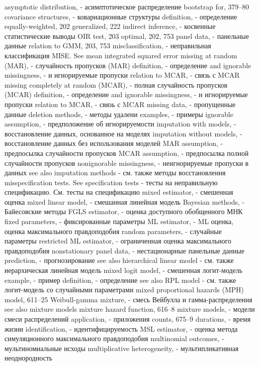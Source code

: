 asymptotic distribution, - асимптотическое распределение
bootstrap for, 379–80 
covariance structures, - ковариационные структуры
definition, - определение
equally-weighted, 202 generalized, 222
indirect inference, - косвенные статистические выводы 
OIR test, 203
optimal, 202, 753
panel data, - панельные данные 
relation to GMM, 203, 753
misclassification, - неправильная классификация
MISE. See mean integrated squared error 
missing at random (MAR), - случайность пропусков (MAR)
definition, - определение
and ignorable missingness, - и игнорируемые пропуски
relation to MCAR, - связь с MCAR
missing completely at random (MCAR), - полная случайность пропусков (MCAR)
definition, - определение
and ignorable missingness, - и игнорируемые пропуски
relation to MCAR, - связь с MCAR
missing data, - пропущенные данные
deletion methods, - методы удалени
examples, - примеры
ignorable assumption, - предположение об игнорируемости
imputation with models, - восстановление данных, основанное на моделях
imputation without models, - восстановление данных без использования моделей
MAR assumption, - предпосылка случайности пропусков
MCAR assumption, - предпосылка полной случайности пропусков
nonignorable missingness, - неигнорируемые пропуски в данных
see also imputation methods - см. также методы восстановления
misspecification tests. See specification tests - тесты на неправильную спецификацию. См. тесты на спецификацию
mixed estimator, - смешенная оценка
mixed linear model, - смешанная линейная модель 
Bayesian methods, - Байесовские методы
FGLS estimator, - оценка доступного обобщенного МНК
fixed parameters, - фиксированные параметры
ML estimator, - ML оценка, оценка максимального правдоподобия
random parameters, - случайные параметры
restricted ML estimator, - ограниченная оценка максимального правдоподобия
nonstationary panel data, - нестационарные панельные данные
prediction, - прогнозирование
see also hierarchical linear model  - см. также иерархическая линейная модель
mixed logit model, - смешенная логит-модель
example, - пример
definition, - определение
see also RPL model - см. также логит-модель со случайными параметрами
mixed proportional hazards (MPH) model, 611–25
Weibull-gamma mixture, - смесь Вейбулла и гамма-распределения
see also mixture models mixture hazard function, 616–8 
mixture models, - модели смеси распределений
application, - приложения
counts, 675–9
durations, - время жизни
identification, - идентифицируемость
MSL estimator, - оценка метода симуляционного максимального правдоподобия
multinomial outcomes, - мультиномиальные исходы
multiplicative heterogeneity, - мультипликативная неоднородность
